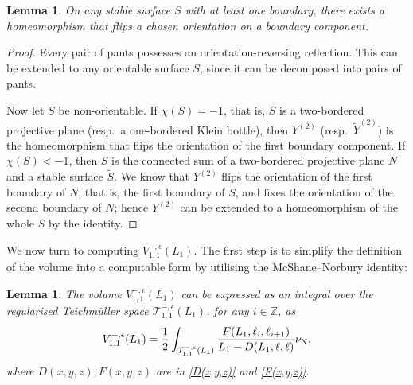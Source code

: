 \documentclass[12pt]{amsart}
\theoremstyle{plain}
\newtheorem{lemma}[theorem]{Lemma}
\theoremstyle{definition}
\theoremstyle{remark}
\numberwithin{equation}{section}
\begin{document}
\begin{lemma}\label{lem:flipping-or-element}
On any stable surface $S$ with at least one boundary, there exists a homeomorphism that flips a chosen orientation on a boundary component.
\end{lemma}
\begin{proof}
Every pair of pants possesses an orientation-reversing reflection. This can be extended to any orientable surface $S$, since it can be decomposed into pairs of pants.

Now let $S$ be non-orientable. If $\chi(S)=-1$, that is, $S$ is a two-bordered projective plane (resp.~a one-bordered Klein bottle), then $Y^{(2)}$ (resp.~$\widetilde{Y}^{(2)}$) is the homeomorphism that flips the orientation of the first boundary component.
If $\chi(S)<-1$, then $S$ is the connected sum of a two-bordered projective plane $N$ and a stable surface $\widetilde{S}$. We know that $Y^{(2)}$ flips the orientation of the first boundary of $N$, that is, the first boundary of $S$, and fixes the orientation of the second boundary of $N$; hence $Y^{(2)}$ can be extended to a homeomorphism of the whole $S$ by the identity.
\end{proof}



We now turn to computing $V_{1,1}^{-,\epsilon}(L_1)$. The first step is to simplify the definition of the volume into a computable form by utilising the McShane--Norbury identity:
\begin{lemma}
The volume $V_{1,1}^{-,\epsilon}(L_1)$ can be expressed as an integral over the regularised Teichm\"{u}ller space $\mathcal{T}_{1,1}^{-,\epsilon}(L_1)$, for any $i\in\mathbb{Z}$, as
\begin{equation}
V_{1,1}^{-,\epsilon}(L_1)=\frac12\int_{\mathcal{T}_{1,1}^{-,\epsilon}(L_1)}\frac{F(L_1,\ell_i,\ell_{i+1})}{L_1-D(L_1,\ell,\ell)}\nu_{{\rm N}},\label{unfolded volume}
\end{equation}
where $D(x,y,z),F(x,y,z)$ are in \eqref{D(x,y,z)} and \eqref{F(x,y,z)}.
\end{lemma}
\end{document}
